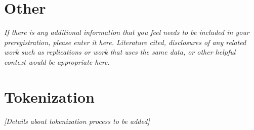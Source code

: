 \documentclass[12pt]{article}
\begin{document}
\section{Other}

\textit{If there is any additional information that you feel needs to be included in your preregistration, please enter it here. Literature cited, disclosures of any related work such as replications or work that uses the same data, or other helpful context would be appropriate here.}

\appendix
\section{Tokenization}
\label{app:tokenization}

\textit{[Details about tokenization process to be added]}
\end{document}
